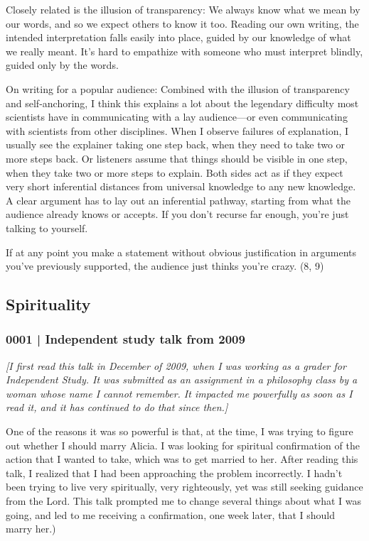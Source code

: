 			Closely related is the illusion of transparency: We always know what we mean by our words, and so we expect others to know it too. Reading our own writing, the intended interpretation falls easily into place, guided by our knowledge of what we really meant. It's hard to empathize with someone who must interpret blindly, guided only by the words.

			On writing for a popular audience: Combined with the illusion of transparency and self-anchoring, I think this explains a lot about the legendary difficulty most scientists have in communicating with a lay audience---or even communicating with scientists from other disciplines. When I observe failures of explanation, I usually see the explainer taking one step back, when they need to take two or more steps back. Or listeners assume that things should be visible in one step, when they take two or more steps to explain. Both sides act as if they expect very short inferential distances from universal knowledge to any new knowledge. A clear argument has to lay out an inferential pathway, starting from what the audience already knows or accepts. If you don't recurse far enough, you're just talking to yourself.

			If at any point you make a statement without obvious justification in arguments you've previously supported, the audience just thinks you're crazy. (8, 9)
			
	\subsection{Spirituality} %
		\label{GM-LIFE-SPIRITUALITY}
		
		\subsubsection{0001 | Independent study talk from 2009} %
			\label{GM-LIFE-SPIRITUALITY-0001}
			
			\textit{[I first read this talk in December of 2009, when I was working as a grader for Independent Study. It was submitted as an assignment in a philosophy class by a woman whose name I cannot remember. It impacted me powerfully as soon as I read it, and it has continued to do that since then.]}

			One of the reasons it was so powerful is that, at the time, I was trying to figure out whether I should marry Alicia. I was looking for spiritual confirmation of the action that I wanted to take, which was to get married to her. After reading this talk, I realized that I had been approaching the problem incorrectly. I hadn't been trying to live very spiritually, very righteously, yet was still seeking guidance from the Lord. This talk prompted me to change several things about what I was going, and led to me receiving a confirmation, one week later, that I should marry her.)

